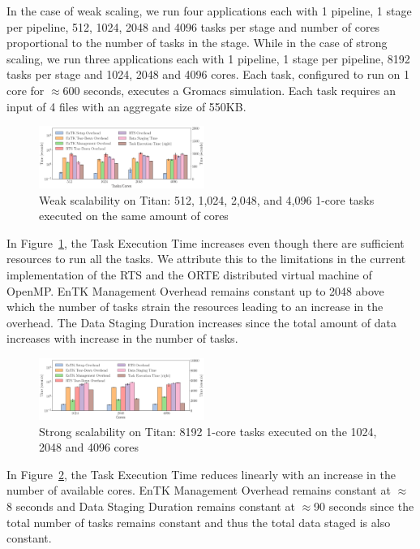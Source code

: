 In the case of weak scaling, we run four applications each with 1 pipeline, 1 
stage per pipeline, 512, 1024, 2048 and 4096 tasks per stage and number of cores
proportional to the number of tasks in the stage. While in the case of strong 
scaling, we run three applications each with 1 pipeline, 1 stage per pipeline, 
8192 tasks per stage and 1024, 2048 and 4096 cores. Each task, configured to
run on 1 core for \(\approx\)600 seconds, executes a Gromacs simulation. Each 
task requires an input of 4 files with an aggregate size of 550KB.
\begin{figure} 
\includegraphics[width=0.48\textwidth]{figs/weak_scaling_titan_orte_reduced.pdf}
\caption{Weak scalability on Titan: 512, 1,024, 2,048, and 4,096
1-core tasks executed on the same amount of cores}\label{fig:weak_scaling}
\end{figure}

In Figure~\ref{fig:weak_scaling}, the Task Execution Time increases even though
there are sufficient resources to run all the tasks. We attribute this to the
limitations in the current implementation of the RTS and the ORTE distributed 
virtual machine of OpenMP. EnTK Management Overhead remains constant up to 2048
above which the number of tasks strain the resources leading to an increase in
the overhead. The Data Staging Duration increases since the total amount of 
data increases with increase in the number of tasks.

\begin{figure} 
\includegraphics[width=0.48\textwidth]{figs/strong_scaling_titan_orte.pdf}
\caption{Strong scalability on Titan: 8192 1-core tasks executed on the 1024, 
2048 and 4096 cores}\label{fig:strong_scaling}
\end{figure}

In Figure~\ref{fig:strong_scaling}, the Task Execution Time reduces linearly 
with an increase in the number of available cores. EnTK Management Overhead 
remains constant at \(\approx\)8 seconds and Data Staging Duration remains 
constant at \(\approx\)90 seconds since the total number of tasks remains
constant and thus the total data staged is also constant.


